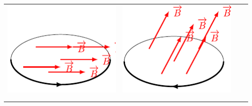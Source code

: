 \documentclass[../../main/main.tex]{subfiles}
\begin{document}
\begin{tcb*}
\begin{center}
\begin{tabularx}{\linewidth}{Y|Y|Y|Y}
			\includegraphics[width=\linewidth]{fluxexo_c} &
			\includegraphics[width=\linewidth]{fluxexo_d}          \\
			                                              &
			                                              &
			                                              &
			\\
			                                              &   &  & \\
		\end{tabularx}
	\end{center}
\end{tcb*}
\end{document}
